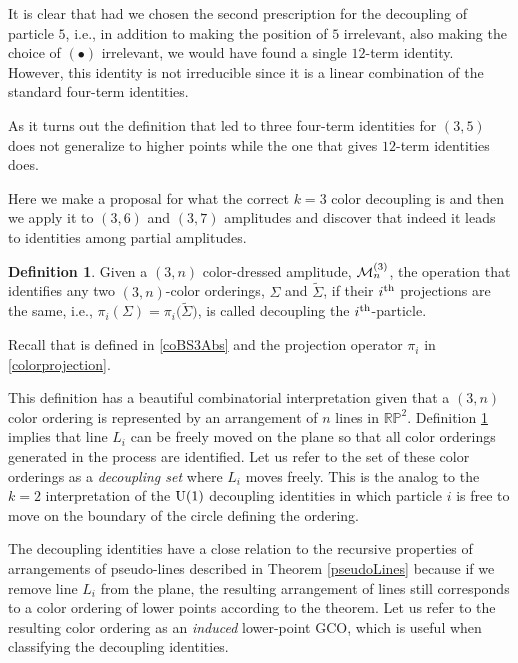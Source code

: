 \documentclass[pdftex]{sigma}
\theoremstyle{definition}
\newtheorem{defn}[thm]{Definition}
\numberwithin{equation}{section}
\begin{document}
It is clear that had we chosen the second prescription for the decoupling of particle $5$, i.e., in addition to making the position of $5$ irrelevant, also making the choice of $(\bullet)$ irrelevant, we would have found a single $12$-term identity. However, this identity is not irreducible since it is a linear combination of the standard four-term identities.

As it turns out the definition that led to three four-term identities for $(3,5)$ does not generalize to higher points while the one that gives $12$-term identities does.

Here we make a proposal for what the correct $k=3$ color decoupling is and then we apply it to $(3,6)$ and $(3,7)$ amplitudes and discover that indeed it leads to identities among partial amplitudes.

\begin{defn}\label{k3decoupling}
Given a $(3,n)$ color-dressed amplitude, ${\cal M}_n^{(3)}$, the operation that identifies any two $(3,n)$-color orderings, $\Sigma$ and $\tilde\Sigma$, if their $i^{\rm th}$ projections are the same, i.e., $\pi_i (\Sigma ) = \pi_i \big(\tilde\Sigma\big)$, is called decoupling the $i^{\rm th}$-particle.
\end{defn}

Recall that  is defined in \eqref{coBS3Abs} and the projection operator $\pi_i$ in \eqref{colorprojection}.

This definition has a beautiful combinatorial interpretation given that a $(3,n)$ color ordering is represented by an arrangement of $n$ lines in $\mathbb{RP}^2$. Definition \ref{k3decoupling} implies that line $L_i$ can be freely moved on the plane so that all color orderings generated in the process are identified. Let us refer to the set of these color orderings as a {\it decoupling set} where $L_i$ moves freely.
This is the analog to the $k=2$ interpretation of the ${\rm U}(1)$ decoupling identities in which particle $i$ is free to move on the boundary of the circle defining the ordering.

The decoupling identities have a close relation to the recursive properties of arrangements of pseudo-lines described in
Theorem \ref{pseudoLines} because if we
remove line $L_i$ from the plane, the resulting arrangement of lines still corresponds to a color ordering of lower points according to the theorem. Let us refer to the resulting color ordering as an {\it induced} lower-point GCO, which is useful when classifying the decoupling identities.
\end{document}
